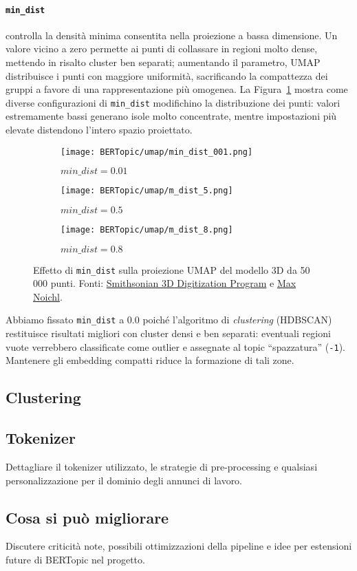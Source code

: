 \paragraph{\texttt{min\_dist}} controlla la densità minima consentita nella proiezione a bassa dimensione. Un valore vicino a zero permette ai punti di collassare in regioni molto dense, mettendo in risalto cluster ben separati; aumentando il parametro, UMAP distribuisce i punti con maggiore uniformità, sacrificando la compattezza dei gruppi a favore di una rappresentazione più omogenea. La Figura~\ref{fig:umap-min-dist} mostra come diverse configurazioni di \texttt{min\_dist} modifichino la distribuzione dei punti: valori estremamente bassi generano isole molto concentrate, mentre impostazioni più elevate distendono l'intero spazio proiettato.
\begin{figure}[H]
\centering

\begin{subfigure}{0.32\textwidth}
    \centering
    \texttt{[image: BERTopic/umap/min\_dist\_001.png]}
    \caption{$min\_dist = 0.01$}
\end{subfigure}\hfill
\begin{subfigure}{0.32\textwidth}
    \centering
    \texttt{[image: BERTopic/umap/m\_dist\_5.png]}
    \caption{$min\_dist = 0.5$}
\end{subfigure}\hfill
\begin{subfigure}{0.32\textwidth}
    \centering
    \texttt{[image: BERTopic/umap/m\_dist\_8.png]}
    \caption{$min\_dist = 0.8$}
\end{subfigure}
\caption{Effetto di \texttt{min\_dist} sulla proiezione UMAP del modello 3D da 50\,000 punti. Fonti: \href{https://3d.si.edu/object/3d/mammuthus-primigenius-blumbach:341c96cd-f967-4540-8ed1-d3fc56d31f12}{Smithsonian 3D Digitization Program} e \href{https://www.maxnoichl.eu/projects/mammoth/}{Max Noichl}.}
\label{fig:umap-min-dist}
\end{figure}
\noindent Abbiamo fissato \texttt{min\_dist} a $0.0$ poiché l'algoritmo di \emph{clustering} (HDBSCAN) restituisce risultati migliori con cluster densi e ben separati: eventuali regioni vuote verrebbero classificate come outlier e assegnate al topic ``spazzatura'' (\texttt{-1}). Mantenere gli embedding compatti riduce la formazione di tali zone.

\subsection{Clustering}


\subsection{Tokenizer}
Dettagliare il tokenizer utilizzato, le strategie di pre-processing e qualsiasi personalizzazione per il dominio degli annunci di lavoro.

\subsection{Cosa si può migliorare}
Discutere criticità note, possibili ottimizzazioni della pipeline e idee per estensioni future di BERTopic nel progetto.
